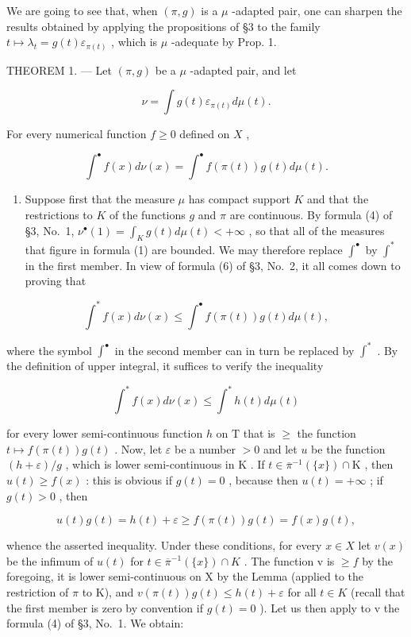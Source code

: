We are going to see that, when \((\pi,g)\) is a \(\mu\) -adapted pair, one can sharpen the results obtained by applying the propositions of §3 to the family \(t\mapsto\lambda_{t}=g(t)\varepsilon_{\pi(t)}\) , which is \(\mu\) -adequate by Prop. 1.

THEOREM 1. --- Let \((\pi, g)\) be a \(\mu\) -adapted pair, and let

\[
\nu = \int g (t) \varepsilon_ {\pi (t)} d \mu (t).
\]

For every numerical function \(f \geqslant 0\) defined on \(X\) ,

\[
\int^ {\bullet} f (x) d \nu (x) = \int^ {\bullet} f (\pi (t)) g (t) d \mu (t).\tag{1}
\]

\begin{enumerate}
\def\labelenumi{\Alph{enumi})}
\tightlist
\item
  Suppose first that the measure \(\mu\) has compact support \(K\) and that the restrictions to \(K\) of the functions \(g\) and \(\pi\) are continuous. By formula (4) of §3, No.~1, \(\nu^{\bullet}(1) = \int_{K} g(t) d\mu(t) < +\infty\) , so that all of the measures that figure in formula (1) are bounded. We may therefore replace \(\int^{\bullet}\) by \(\int^{*}\) in the first member. In view of formula (6) of §3, No.~2, it all comes down to proving that
\end{enumerate}

\[
\int^ {*} f (x) d \nu (x) \leqslant \int^ {\bullet} f (\pi (t)) g (t) d \mu (t),\tag{2}
\]

where the symbol \(\int^{\bullet}\) in the second member can in turn be replaced by \(\int^{*}\) . By the definition of upper integral, it suffices to verify the inequality

\[
\int^ {*} f (x) d \nu (x) \leqslant \int^ {*} h (t) d \mu (t)\tag{3}
\]

for every lower semi-continuous function \(h\) on \(\mathrm{T}\) that is \(\geqslant\) the function \(t \mapsto f(\pi(t))g(t)\) . Now, let \(\varepsilon\) be a number \(> 0\) and let \(u\) be the function \((h + \varepsilon)/g\) , which is lower semi-continuous in \(\mathrm{K}\) . If \(t \in \overline{\pi}^{-1}(\{x\}) \cap \mathrm{K}\) , then \(u(t) \geqslant f(x)\) : this is obvious if \(g(t) = 0\) , because then \(u(t) = +\infty\) ; if \(g(t) > 0\) , then

\[
u (t) g (t) = h (t) + \varepsilon \geqslant f (\pi (t)) g (t) = f (x) g (t),
\]

whence the asserted inequality. Under these conditions, for every \(x \in X\) let \(v(x)\) be the infimum of \(u(t)\) for \(t \in \overline{\pi}^{-1}(\{x\}) \cap K\) . The function v is \(\geqslant f\) by the foregoing, it is lower semi-continuous on X by the Lemma (applied to the restriction of \(\pi\) to K), and \(v(\pi(t))g(t) \leqslant h(t) + \varepsilon\) for all \(t \in K\) (recall that the first member is zero by convention if \(g(t) = 0\) ). Let us then apply to v the formula (4) of §3, No.~1. We obtain:

